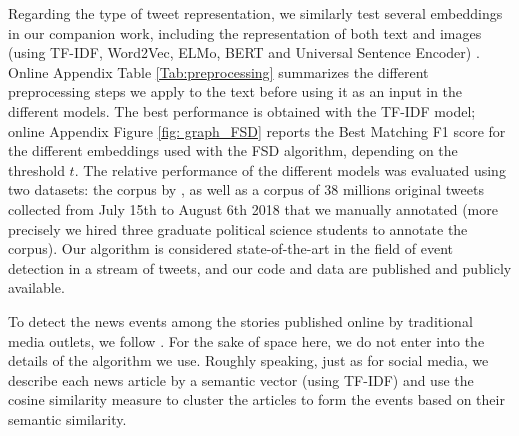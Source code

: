 Regarding the type of tweet representation, we similarly test several embeddings in our companion work, including the representation of both text and images (using TF-IDF, Word2Vec, ELMo, BERT and Universal Sentence Encoder) \citep{MazoyerHerveHudelotCage2020}. Online Appendix Table \ref{Tab:preprocessing} summarizes the different preprocessing steps we apply to the text before using it as an input in the different models. The best performance is obtained with the TF-IDF model; online Appendix Figure \ref{fig: graph_FSD} reports the Best Matching F1 score for the different embeddings used with the FSD algorithm, depending on the threshold $t$. The relative performance of the different models was evaluated using two datasets: the corpus by \cite{mcminn_building_2013}, as well as a corpus of 38 millions original tweets collected from July 15th to August 6th 2018 that we manually annotated (more precisely we hired three graduate political science students to annotate the corpus). Our  algorithm is considered state-of-the-art in the field of event detection in a stream of tweets, and our code and data are published and publicly available.

To detect the news events among the stories published online by traditional media outlets, we follow \citet{CageHerveViaud2020}. For the sake of space here, we do not enter into the details of the algorithm we use. Roughly speaking, just as for social media, we describe each news article by a semantic vector (using TF-IDF) and use the cosine similarity measure to cluster the articles to form the events based on their semantic similarity.


%



